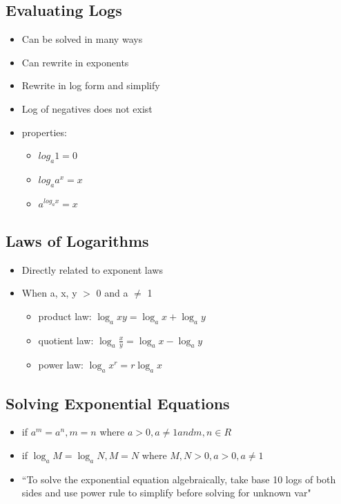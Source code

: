 \documentclass{article}
\begin{document}
    \subsection{Evaluating Logs}
    \begin{itemize}
        \item Can be solved in many ways
        \item Can rewrite in exponents
        \item Rewrite in log form and simplify
        \item Log of negatives does not exist
        \item properties:
        \begin{itemize}
            \item $log_a1=0$
            \item $log_aa^x=x$
            \item $a^{log_ax} = x$
        \end{itemize}
    \end{itemize}

    \subsection{Laws of Logarithms}
    \begin{itemize}
        \item Directly related to exponent laws
        \item When a, x, y $>$ 0 and a $\neq$ 1
        \begin{itemize}
            \item product law: $\log_axy = \log_ax + \log_ay$
            \item quotient law: $\log_a \frac{x}{y} = \log_ax - \log_ay$
            \item power law: $\log_ax^r = r \log_ax$
        \end{itemize}
    \end{itemize}

    \subsection{Solving Exponential Equations}
    \begin{itemize}
        \item if $a^m = a^n, m = n$ where $a > 0, a \neq 1 and m, n \in R$
        \item if $\log_aM = \log_aN, M = N$ where $ M, N > 0, a > 0, a \neq 1$
        \item ``To solve the exponential equation algebraically, take base 10 logs of both sides and use power rule to simplify before solving for unknown var"
    \end{itemize}
\end{document}
